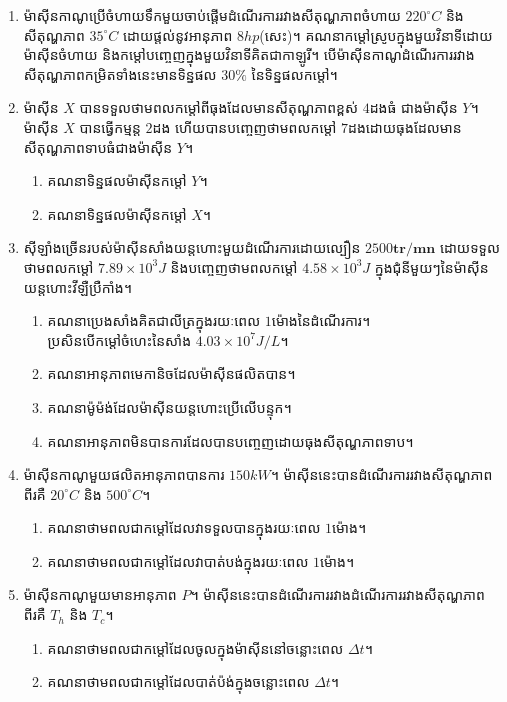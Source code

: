 \begin{enumerate}
	\item ម៉ាសុីនកាណូប្រើចំហាយទឹកមួយចាប់ផ្តើមដំណើរការរវាងសីតុណ្ហភាពចំហាយ $220^\circ C$ និងសីតុណ្ហភាព $35^\circ C$ ដោយផ្តល់នូវអានុភាព $8hp$(សេះ)។ គណនាកម្តៅស្រូបក្នុងមួយវិនាទីដោយម៉ាសុីនចំហាយ និងកម្តៅបញ្ចេញក្នុងមួយវិនាទីគិតជាកាឡូរី។ បើម៉ាសុីនកាណូដំណើរការរវាងសីតុណ្ហភាពកម្រិតទាំងនេះមានទិន្នផល $30\%$ នៃទិន្នផលកម្តៅ។
	\newpage
	\item ម៉ាសុីន $X$ បានទទួលថាមពលកម្តៅពីធុងដែលមានសីតុណ្ហភាពខ្ពស់ $4$ដងធំ ជាងម៉ាសុីន $Y$។ ម៉ាសុីន $X$ បានធ្វើកម្មន្ត $2$ដង ហើយបានបញ្ចេញថាមពលកម្តៅ $7$ដងដោយធុងដែលមានសីតុណ្ហភាពទាបធំជាងម៉ាសុីន $Y$។
	\begin{enumerate}
		\item គណនាទិន្នផលម៉ាសុីនកម្តៅ $Y$។
		\item គណនាទិន្នផលម៉ាសុីនកម្តៅ $X$។
	\end{enumerate}
	\item សុីឡាំងច្រើនរបស់ម៉ាសុីនសាំងយន្តហោះមួយដំណើរការដោយល្បឿន $2500\mathbf{tr/mn}$ ដោយទទួលថាមពលកម្តៅ $7.89\times10^{3}J$ និងបញ្ចេញថាមពលកម្តៅ $4.58\times10^{3}J$ ក្នុងជុំនីមួយៗនៃម៉ាសុីនយន្តហោះវីឡឺ​​​ប្រឺ​​កាំង។
	\begin{enumerate}
		\item គណនាប្រេងសាំងគិតជាលីត្រក្នុងរយៈពេល $1$ម៉ោងនៃដំណើរការ។\\ ប្រសិនបើកម្តៅចំហេះនៃសាំង $4.03\times10^{7}J/L$។
		\item គណនាអានុភាពមេកានិចដែលម៉ាសុីនផលិតបាន។
		\item គណនាម៉ូម៉ង់ដែលម៉ាសុីនយន្តហោះប្រើលើបន្ទុក។
		\item គណនាអានុភាពមិនបានការដែលបានបញ្ចេញដោយធុងសីតុណ្ហភាពទាប។
	\end{enumerate}
	\item ម៉ាសុីនកាណូមួយផលិតអានុភាពបានការ $150kW$។ ម៉ាសុីននេះបានដំណើរការរវាងសីតុណ្ហភាពពីរគឺ $20^\circ C$ និង $500^\circ C$។
	\begin{enumerate}
		\item គណនាថាមពលជាកម្តៅដែលវាទទួលបានក្នុងរយៈពេល $1$ម៉ោង។
		\item គណនាថាមពលជាកម្តៅដែលវាបាត់បង់ក្នុងរយៈពេល $1$ម៉ោង។
	\end{enumerate}
	\item ម៉ាសុីនកាណូមួយមានអានុភាព $P$។ ម៉ាសុីននេះបានដំណើរការរវាងដំណើរការរវាងសីតុណ្ហភាពពីរគឺ $T_{h}$ និង $T_{c}$។
	\begin{enumerate}
		\item គណនាថាមពលជាកម្តៅដែលចូលក្នុងម៉ាសុីននៅចន្លោះពេល $\Delta t$។
		\item គណនាថាមពលជាកម្តៅដែលបាត់ប៉ង់ក្នុងចន្លោះពេល $\Delta t$។
	\end{enumerate}

\end{enumerate}

